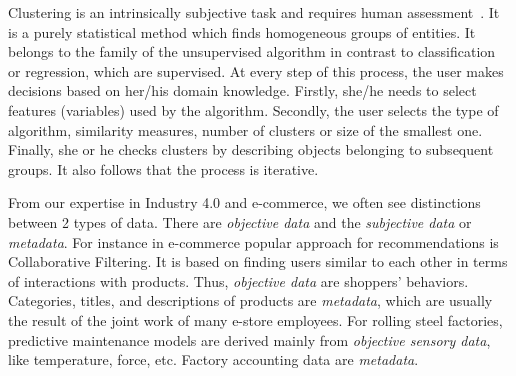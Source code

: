 \documentclass[
 twocolumn,
 hf,
]{ceurart}
\begin{document}
Clustering is an intrinsically subjective task and requires human assessment~\cite{10.1145/3340960}.
It is a purely statistical method which finds homogeneous groups of entities.
It belongs to the family of the unsupervised algorithm in contrast to classification or regression, which are supervised.
At every step of this process, the user makes decisions based on her/his domain knowledge.
Firstly, she/he needs to select features (variables) used by the algorithm.
Secondly, the user selects the type of algorithm, similarity measures, number of clusters or size of the smallest one.
Finally, she or he checks clusters by describing objects belonging to subsequent groups.
It also follows that the process is iterative.

From our expertise in Industry 4.0 and e-commerce, we often see distinctions between 2 types of data.
There are \textit{objective data} and the \textit{subjective data} or \textit{metadata}.
For instance in e-commerce popular approach for recommendations is Collaborative Filtering.
It is based on finding users similar to each other in terms of interactions with products.
Thus, \textit{objective data} are shoppers' behaviors.
Categories, titles, and descriptions of products are \textit{metadata}, which are usually the result of the joint work of many e-store employees.
For rolling steel factories, predictive maintenance models are derived mainly from \textit{objective sensory data}, like temperature, force, etc.
Factory accounting data are \textit{metadata}.
\end{document}
